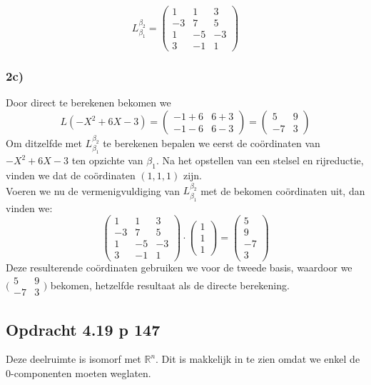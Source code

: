 \documentclass[lineaire_algebra_oplossingen.tex]{subfiles}
\begin{document}
\[
L^{\beta_2}_{\beta_1} =
\begin{pmatrix}
1 & 1 & 3\\
-3 & 7 & 5\\
1 & -5 & -3\\
3 & -1 & 1
\end{pmatrix}
\]

\subsubsection*{2c)}
Door direct te berekenen bekomen we
\[
L(-X^2+6X-3)
= \begin{pmatrix}
-1+6 & 6+3 \\
-1-6 & 6-3
\end{pmatrix}
= \begin{pmatrix}
5  & 9 \\
-7 & 3
\end{pmatrix}
\]
Om ditzelfde met $L^{\beta_2}_{\beta_1}$ te berekenen bepalen we eerst de co\"ordinaten van $-X^2+6X-3$ ten opzichte van $\beta_1$.
Na het opstellen van een stelsel en rijreductie, vinden we dat de co\"ordinaten $(1,1,1)$ zijn.\\
Voeren we nu de vermenigvuldiging van $L^{\beta_2}_{\beta_1}$ met de bekomen co\"ordinaten uit, dan vinden we:
\[
\begin{pmatrix}
1 & 1 & 3\\
-3 & 7 & 5\\
1 & -5 & -3\\
3 & -1 & 1
\end{pmatrix} \cdot
\begin{pmatrix}
1\\
1\\
1
\end{pmatrix} =
\begin{pmatrix}
5\\
9\\
-7\\
3
\end{pmatrix}
\]
Deze resulterende co\"ordinaten gebruiken we voor de tweede basis, waardoor we $\bigl(
\begin{smallmatrix}
5&9\\ -7&3
\end{smallmatrix}\bigr)$ bekomen, hetzelfde resultaat als de directe berekening.


\subsection{Opdracht 4.19 p 147}
\label{4.19}
Deze deelruimte is isomorf met $\mathbb{R}^n$. Dit is makkelijk in te zien omdat we enkel de 0-componenten moeten weglaten. 
\end{document}
